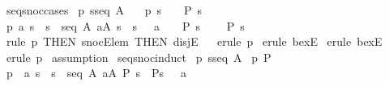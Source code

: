 \begin{isabellebody}
\isanewline
\isanewline
{}\isamarkupfalse%
\ seqsnoc{\isacharunderscore}cases{\isacharcolon}\isanewline
{}\ p{}{\isacharcolon}\ {\isachardoublequoteopen}s{\isacharcolon}seq\ A{\isachardoublequoteclose}\ \ \isanewline
{}\ p{}{\isacharcolon}\ {\isachardoublequoteopen}s\ {\isacharequal}\ {\isacharpercent}{\isacharless}{\isacharpercent}{\isachargreater}\ {\isacharequal}{\isacharequal}{\isachargreater}\ P\ s{\isachardoublequoteclose}\ \ \isanewline
{}\ p{}{\isacharcolon}\ {\isachardoublequoteopen}{\isacharbang}{\isacharbang}a\ s{\isacharprime}{\isachardot}\ {\isasymlbrakk}\ s{\isacharprime}\ {\isacharcolon}\ seq\ A{\isacharsemicolon}\ a{\isacharcolon}A{\isacharsemicolon}\ s\ {\isacharequal}\ s{\isacharprime}\ {\isacharpercent}{\isacharampersand}{\isacharcircum}\ {\isacharpercent}{\isacharless}\ a\ {\isacharpercent}{\isachargreater}\ {\isasymrbrakk}\ {\isasymLongrightarrow}\ P\ s{\isachardoublequoteclose}\ \ \isanewline
{}\ \ {\isachardoublequoteopen}P\ s{\isachardoublequoteclose}\isanewline
%
\isadelimproof
%
\endisadelimproof
%
\isatagproof
{}\isamarkupfalse%
\ {\isacharparenleft}rule\ p{}\ {\isacharbrackleft}THEN\ snocE{\isacharunderscore}lem\ {\isacharbrackleft}THEN\ disjE{\isacharbrackright}{\isacharbrackright}{\isacharparenright}\isanewline
{}\isamarkupfalse%
\ {}\isanewline
{}\isamarkupfalse%
\ {\isacharparenleft}erule\ p{}{\isacharparenright}\isanewline
{}\isamarkupfalse%
\ {\isacharparenleft}erule\ bexE{\isacharparenright}\isanewline
{}\isamarkupfalse%
\ {\isacharparenleft}erule\ bexE{\isacharparenright}\isanewline
{}\isamarkupfalse%
\ {\isacharparenleft}erule\ p{}{\isacharparenright}\isanewline
{}\isamarkupfalse%
\ assumption{\isacharplus}\isanewline
{}\isamarkupfalse%
%
\endisatagproof
{\isafoldproof}%
%
\isadelimproof
\isanewline
%
\endisadelimproof
\isanewline
{}\isamarkupfalse%
\ seq{\isacharunderscore}snocinduct{\isacharcolon}\isanewline
{}\ p{}{\isacharcolon}\ {\isachardoublequoteopen}s{\isacharcolon}seq\ A{\isachardoublequoteclose}\isanewline
{}\ p{}{\isacharcolon}\ {\isachardoublequoteopen}P\ {\isacharpercent}{\isacharless}{\isacharpercent}{\isachargreater}{\isachardoublequoteclose}\isanewline
{}\ p{}{\isacharcolon}\ {\isachardoublequoteopen}{\isacharbang}{\isacharbang}\ a\ s{\isachardot}\ {\isacharbrackleft}{\isacharbar}\ s\ {\isacharcolon}\ seq\ A{\isacharsemicolon}\ a{\isacharcolon}A{\isacharsemicolon}\ P\ s{\isacharbar}{\isacharbrackright}\ {\isacharequal}{\isacharequal}{\isachargreater}\ P{\isacharparenleft}s\ {\isacharpercent}{\isacharampersand}{\isacharcircum}\ {\isacharpercent}{\isacharless}\ a\ {\isacharpercent}{\isachargreater}{\isacharparenright}{\isachardoublequoteclose}\isanewline

\end{isabellebody}

